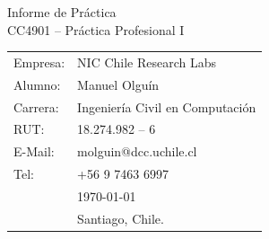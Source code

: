 \documentclass[11pt,letterpaper]{article}
\begin{document}
\newpage
\pagestyle{fancy}
\fancyhf{}
\vspace*{6cm}
\begin{center}
\Huge  {Informe de Práctica}\\
\vspace{1cm}
\small {CC4901 -- Práctica Profesional I}\\
\end{center}
\vfill
\begin{flushright}
\begin{tabular}{ll}
Empresa: & NIC Chile Research Labs\\
Alumno: & Manuel Olguín\\
Carrera: & Ingeniería Civil en Computación\\
RUT:& 18.274.982 -- 6\\
E-Mail: & molguin@dcc.uchile.cl\\
Tel: & +56 9 7463 6997\\
& \today\\
& Santiago, Chile.
\end{tabular}
\end{flushright}

\newpage
\pagestyle{fancy}
\fancyhf{}


\fancyfoot[R]{\small \rm \textbf{\thepage}} %

\end{document}
